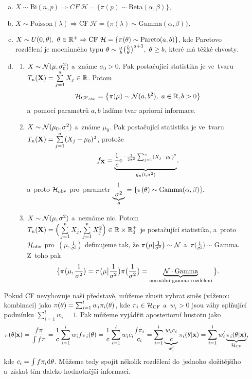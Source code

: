 \begin{example}[Příklady CF]
\begin{enumerate}[a)]
	\item $X\sim \mathrm{Bi}(n,p)\Rightarrow CF~\mathcal{H}=\{\pi(p)\sim\mathrm{Beta}(\alpha,\beta)\}$,
	\item $X\sim\mathrm{Poisson}(\lambda)\Rightarrow \mathrm{CF}~\mathcal{H}=\{\pi(\lambda)\sim\mathrm{Gamma}(\alpha,\beta)\}$,
	\item $X\sim U(0,\theta),~\theta\in\mathbb{R}^+\Rightarrow \mathrm{CF}~\mathcal{H}=\{\pi(\theta)\sim\mathrm{Pareto}(a,b)\}$, kde Paretovo rozdělení je mocninného typu $\theta\sim\frac{a}{b}\big(\frac{b}{\theta}\big)^{a+1},~\theta\geq b$, které má těžké chvosty.
	\item \begin{enumerate}[1)]
		\item $X\sim \mathcal{N}(\mu,\sigma_0^2)$ a~známe $\sigma_0>0$. Pak postačující statistika je ve~tvaru $T_n(\textbf{X})=\sum\limits_{j=1}^{n} X_j\in\mathbb{R}$. Potom $$\mathcal{H}_{\mathrm{CF}_{obv}}=\big\{\pi(\mu)\sim\mathcal{N}(a,b^2),~a\in\mathbb{R},b>0\big\}$$ a~pomocí parametrů $a,b$ ladíme tvar apriorní informace.
		\item $X\sim\mathcal{N}(\mu_0,\sigma^2)$ a~známe $\mu_0$. Pak postačující statistika je ve~tvaru $T_n(\textbf{X})=\sum\limits_{j=1}^{n}(X_j-\mu_0)^2$, protože 
		$$ f_{\textbf{X}}=\underbrace{\frac{1}{c}\mathrm{e}^{-\frac{1}{2\sigma^2}\sum_{j=1}^n(X_j-\mu_0)^2}}_{g_n(t,\sigma^2)},$$ a~proto $\mathcal{H}_\text{obv}$ pro~parametr $\underbrace{\frac{1}{\sigma^2}}_{\theta}=\{\pi(\theta)\sim\mathrm{Gamma}(\alpha,\beta)\}.$
		\item $X\sim\mathcal{N}(\mu,\sigma^2)$ a~neznáme nic. Potom $T_n(\textbf{X})=\Big(\sum\limits_{j=1}^{n} X_j,\sum\limits_{j=1}^{n} X_j^2\Big)\in\mathbb{R}\times\mathbb{R}_0^+$ je postačující statistika, a~proto
		$\mathcal{H}_\text{obv}$ pro~$(\mu,\frac{1}{\sigma^2})$ definujeme tak, že $\pi\big(\mu|\frac{
		1}{\sigma^2}\big)\sim\mathcal{N}$ a~$\pi\big(\frac{1}{\sigma^2}\big)\sim\mathrm{Gamma}$. Z~toho pak 
		$$\big\{ \pi\big(\mu,\frac{1}{\sigma^2}\big)=\pi\big(\mu\big|\frac{1}{\sigma^2}\big)\pi\big(\frac{1}{\sigma^2}\big)=\underbrace{\mathcal{N}\cdot\mathrm{Gamma}}_{\text{normální-gamma rozdělení}}\big\}.$$
	\end{enumerate}
\end{enumerate}
\end{example}
\begin{remark}[Směs z~CF] Pokud CF nevyhovuje naší představě, můžeme zkusit vybrat směs (váženou kombinaci) jako
	$\pi(\theta)=\sum_{i=1}^lw_i\pi_i(\theta)$, kde $\pi_i\in\mathcal{H}_\mathrm{CF}$ a~$w_i>0$ jsou váhy splňující podmínku $\sum_{i=1}^l w_i=1$. Pak můžeme vyjádřit aposteriorní hustotu jako $$\pi(\theta|\textbf{x})=\frac{f\pi}{\int f\pi}=\frac{1}{c}\sum_{i=1}^lw_i f\pi_i(\theta)=\frac{1}{c}\sum_{i=1}^l w_ic_i\frac{f \pi_i}{c_i}=\sum_{i=1}^l \underbrace{\frac{w_ic_i}{c}}_{w_i'}\pi_i(\theta|\textbf{x})=\sum_{i=1}^l w_i'\underbrace{\pi_i(\theta|\textbf{x})}_{\mathcal{H}_\mathrm{CF}},$$
	kde $c_i=\int f\pi_i\mathrm{d}\theta$. Můžeme tedy spojit několik rozdělení do~jednoho složitějšího a~získat tím daleko hodnotnější informaci.
\end{remark}

